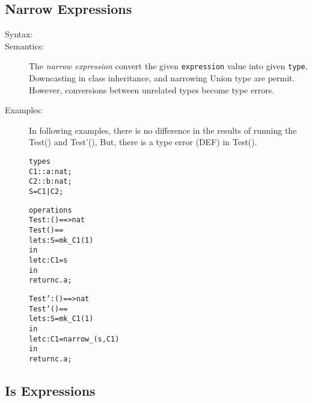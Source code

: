 \documentclass[\pformat,12pt]{article}
\begin{document}
\subsection{Narrow Expressions}

\begin{description}
\item[Syntax:]


    \item[Semantics:] The {\it narrow expression} convert the given {\tt expression} value into given {\tt type}.
	Downcasting in class inheritance, and narrowing Union type are permit.
	However, conversions between unrelated types become type errors.
    
    \item[Examples:] In following examples, there is no difference in the results of running the Test() and Test'(), 
	But, there is a type error (DEF) in Test().

\begin{alltt}
types
C1 :: a : nat;
C2 :: b : nat;
S = C1 | C2;

operations
Test: () ==> nat
Test() ==
 let s : S = mk_C1(1)
 in
   let c : C1 = s
   in
     return c.a;

Test': () ==> nat
Test'() ==
 let s : S = mk_C1(1)
 in
   let c : C1 = narrow_(s, C1)
   in
     return c.a;
\end{alltt}

\end{description}


\subsection{Is Expressions}
\end{document}
